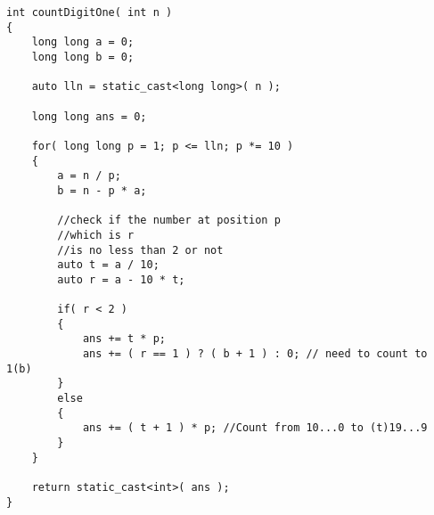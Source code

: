 \begin{lstlisting}[style=customc, caption={Mathematical Induction}]
int countDigitOne( int n )
{
    long long a = 0;
    long long b = 0;

    auto lln = static_cast<long long>( n );

    long long ans = 0;

    for( long long p = 1; p <= lln; p *= 10 )
    {
        a = n / p;
        b = n - p * a;

        //check if the number at position p
        //which is r
        //is no less than 2 or not
        auto t = a / 10;
        auto r = a - 10 * t;

        if( r < 2 )
        {
            ans += t * p;
            ans += ( r == 1 ) ? ( b + 1 ) : 0; // need to count to 1(b)
        }
        else
        {
            ans += ( t + 1 ) * p; //Count from 10...0 to (t)19...9
        }
    }

    return static_cast<int>( ans );
}
\end{lstlisting}